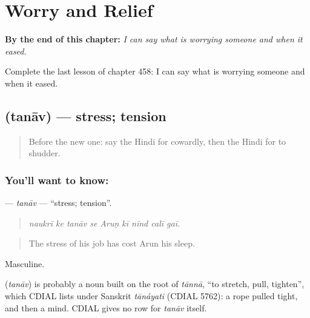 
\chapter{Worry and Relief}
\label{ch:hi-worry-and-relief}

\begin{chapteropening}
\textbf{By the end of this chapter:} \emph{I can say what is worrying someone and when it eased.}

Complete the last lesson of chapter 458: I can say what is worrying someone and when it eased.
\end{chapteropening}

\section[\texorpdfstring{\hi{तनाव} (tanāv)}{तनाव (tanāv)}]{ (tanāv) — stress; tension}

\label{lesson:HI-C458-tanav}



\begin{quote}
Before the new one: say the Hindi for cowardly, then the Hindi for to shudder.
\end{quote}

\subsection*{You'll want to know: }
\textbf{} — \emph{tanāv} — \textquotedblleft{}stress; tension\textquotedblright{}.

\begin{quote}
        
\end{quote}

\begin{quote}
\emph{naukrī ke tanāv se Aruṇ kī nīnd calī gaī.}
\end{quote}

\begin{quote}
The stress of his job has cost Arun his sleep.
\end{quote}

Masculine.

\begin{cousinweb}
\textbf{} (\emph{tanāv}) is probably a noun built on the root of \emph{tānnā}, \textquotedblleft{}to stretch, pull, tighten\textquotedblright{}, which CDIAL lists under Sanskrit \emph{tānáyati} (CDIAL 5762): a rope pulled tight, and then a mind. CDIAL gives no row for \emph{tanāv} itself.
\end{cousinweb}

